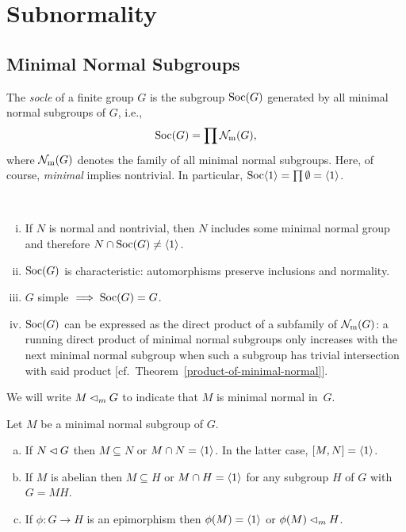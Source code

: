\chapter{Subnormality}
\section{Minimal Normal Subgroups}

\begin{defn}\label{socle-defn}
    The \textsl{socle} of a finite group\/ $G$ is the subgroup ${\rm Soc}(G)$ generated by all minimal normal subgroups of\/ $G$, i.e.,
    $$
        {\rm Soc}(G) = \prod\operatorname{{\cal N}_m}(G),
    $$
    where\/ $\operatorname{{\cal N}_m}(G)$ denotes the family of all minimal normal subgroups. Here, of course, \textsl{minimal} implies nontrivial. In particular, ${\rm Soc}\langle1\rangle=\prod\emptyset=\langle1\rangle$.
\end{defn}

\begin{rems}\label{soc-intersection}\ 
    \begin{enumerate}[i),font=\upshape]
        \item If $N$ is normal and nontrivial, then $N$ includes some minimal normal group and therefore $N\cap{\rm Soc}(G)\ne\langle1\rangle$.
        \item ${\rm Soc}(G)$ is characteristic\/\textrm{\upshape: automorphisms preserve inclusions and normality.}
        \item $G$ simple $\implies{\rm Soc}(G) = G$.
        \item ${\rm Soc}(G)$ can be expressed as the direct product of a subfamily of\/ $\operatorname{{\cal N}_m}(G)$\textrm{\upshape: a running direct product of minimal normal subgroups only increases with the next minimal normal subgroup when such a subgroup has trivial intersection with said product [cf.~Theorem~\ref{product-of-minimal-normal}].}
    \end{enumerate}
\end{rems}

\begin{ntn}
    We will write $M\lhd_m G$ to indicate that $M$ is minimal normal in~$G$.
\end{ntn}


\begin{prop}
    Let\/ $M$ be a minimal normal subgroup of\/ $G$.
    \begin{enumerate}[a),font=\upshape]
        \item If\/ $N\lhd G$ then\/ $M \subseteq N$ or\/ $M \cap N = \langle1\rangle$. In the latter case, $[M, N] = \langle1\rangle$.
        \item If\/ $M$ is abelian then\/ $M \subseteq H$ or\/ $M \cap H = \langle1\rangle$ for any subgroup\/ $H$ of\/ $G$ with\/ $G = MH$.
        \item If\/ $\phi\colon G\to H$ is an epimorphism then\/ $\phi(M) = \langle1\rangle$ or\/ $\phi(M)\lhd_mH$.
    \end{enumerate}
\end{prop}

